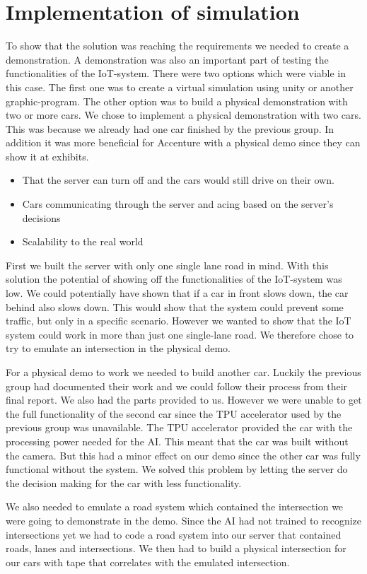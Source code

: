 \section{Implementation of simulation}
To show that the solution was reaching the requirements we needed to create a demonstration. A demonstration was also an important part of testing the functionalities of the IoT-system. There were two options which were viable in this case. The first one was to create a virtual simulation using unity or another graphic-program. The other option was to build a physical demonstration with two or more cars. We chose to implement a physical demonstration with two cars. This was because we already had one car finished by the previous group. In addition it was more beneficial for Accenture with a physical demo since they can show it at exhibits.
\begin{itemize}
	\item That the server can turn off and the cars would still drive on their own.
	\item Cars communicating through the server and acing based on the server’s decisions
	\item Scalability to the real world
\end{itemize}
First we built the server with only one single lane road in mind. With this solution the potential of showing off the functionalities of the IoT-system was low. We could potentially have shown that if a car in front slows down, the car behind also slows down. This would show that the system could prevent some traffic, but only in a specific scenario. However we wanted to show that the IoT system could work in more than just one single-lane road. We therefore chose to try to emulate an intersection in the physical demo.

For a physical demo to work we needed to build another car. Luckily the previous group had documented their work and we could follow their process from their final report. We also had the parts provided to us. However we were unable to get the full functionality of the second car since the TPU accelerator used by the previous group was unavailable. The TPU accelerator provided the car with the processing power needed for the AI. This meant that the car was built without the camera. But this had a minor effect on our demo since the other car was fully functional without the system. We solved this problem by letting the server do the decision making for the car with less functionality.

We also needed to emulate a road system which contained the intersection we were going to demonstrate in the demo. Since the AI had not trained to recognize intersections yet we had to code a road system into our server that contained roads, lanes and intersections. We then had to build a physical intersection for our cars with tape that correlates with the emulated intersection. 
